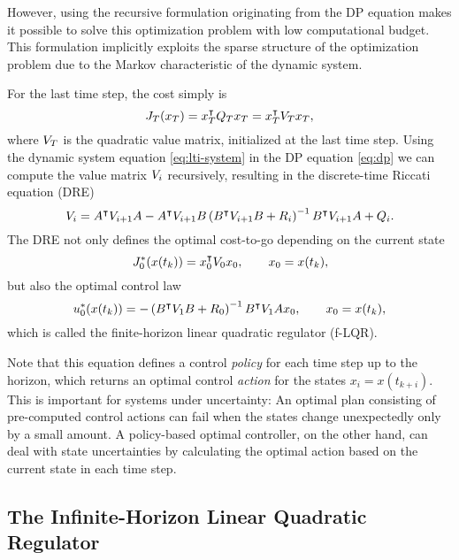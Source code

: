 However, using the recursive formulation originating from the DP equation
makes it possible to solve this optimization problem with low computational
budget. This formulation implicitly exploits the sparse structure of the
optimization problem due to the Markov characteristic of the dynamic system.

For the last time step, the cost simply is
\begin{equation}
  J_T(x_T) = x_T^{\intercal} Q_T x_T = x_T^{\intercal} V_T x_T,
\end{equation}
where $V_T$ is the quadratic value matrix, initialized at the last time step.
Using the dynamic system equation \eqref{eq:lti-system} in the DP equation
\eqref{eq:dp} we can compute the value matrix $V_i$ recursively, resulting in
the discrete-time Riccati equation (DRE) \cite[]{Bertsekas:2005:Dynamic}
\begin{equation}
  \label{eq:dp-recursion}
  \VM_\i =  A\T \VM_{\i+1} A - A\T \VM_{\i+1} B
  \left(B\T \VM_{\i+1} B + R_\i\right)\inv B\T
  \VM_{\i+1} A + \SC_\i.
\end{equation}
The DRE not only defines the optimal cost-to-go depending on the current state
\begin{equation}\vspace{-\baselineskip}
  J_0^*(x(t_k)) = x_0\T \VM_0 x_0, \qq x_0 = x(t_k),
\end{equation}
but also the optimal control law
\begin{equation}
  \label{eq:dp-policy}
  u_0^*(x(t_k)) = -\left(B\T \VM_1 B + R_0\right)\inv B\T \VM_1 A x_0,
  \qq x_0 = x(t_k),
\end{equation}
which is called the finite-horizon linear quadratic regulator (f-LQR).

Note that this equation defines a control \emph{policy} for each time step up
to the horizon, which returns an optimal control \emph{action} for the states
$x_i = x(t_{k+i})$. This is important for systems under uncertainty: An optimal
plan consisting of pre-computed control actions can fail when the states change
unexpectedly only by a small amount. A policy-based optimal controller, on the
other hand, can deal with state uncertainties by calculating the optimal action
based on the current state in each time step.

\subsection{The Infinite-Horizon Linear Quadratic Regulator}

